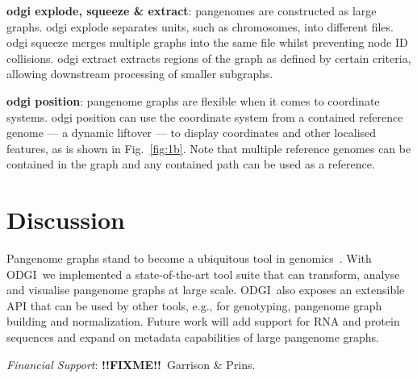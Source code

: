 \documentclass{bioinfo}
\newcommand{\odgi}{ODGI}
\newcommand{\FIXME}{\textbf{!!FIXME!!}}
\newcommand{\cmd}[1]{\textrm{#1}}
\newcommand{\cmdbf}[1]{{\textbf{#1}}}
\newcommand{\topic}[1]{{\cmdbf{#1}}:}
\begin{document}
    \topic{odgi explode, squeeze \& extract} pangenomes are constructed
    as large graphs. \cmd{odgi explode} separates units, such as
    chromosomes, into different files. \cmd{odgi squeeze} merges
    multiple graphs into the same file whilst preventing node ID
    collisions. \cmd{odgi extract} extracts regions of the graph as
    defined by certain criteria, allowing downstream processing of
    smaller subgraphs.

    \topic{odgi position} pangenome graphs are flexible when it comes
    to coordinate systems. \cmd{odgi position} can use the coordinate
    system from a contained reference genome --- a dynamic liftover
    --- to display coordinates and other localised features, as is shown in
    Fig.~\ref{fig:1b}. Note that multiple reference genomes can be contained
    in the graph and any contained path can be used as a reference.

    \vspace{-0.1in}

    \section{Discussion}

    Pangenome graphs stand to become a ubiquitous tool in
    genomics~\citep{Eizenga:2020}. With \odgi\ we implemented a
    state-of-the-art tool suite that can transform, analyse and
    visualise pangenome graphs at large scale. \odgi\ also exposes an
    extensible API that can be used by other tools, e.g., for
    genotyping, pangenome graph building and normalization.  Future
    work will add support for RNA and protein sequences and expand on
    metadata capabilities of large pangenome graphs.

    



%
%

    \textit{Financial Support}: \FIXME\ Garrison \& Prins.
\end{document}
